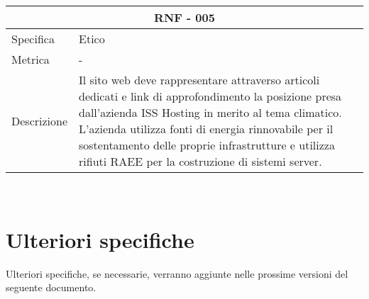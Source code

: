 \documentclass{article}
\begin{document}
\vspace{4mm} 
\begin{tabular}{ |p{3cm}|p{8cm}|  }
	\hline
	\multicolumn{2}{|c|}{\textbf{RNF - 005}} \\
	\hline
	Specifica&Etico \\
	\hline
	Metrica &  -\\
\hline
	Descrizione&Il sito web deve rappresentare attraverso articoli dedicati e link di approfondimento la posizione presa dall'azienda ISS Hosting in merito al tema climatico. L'azienda utilizza fonti di energia rinnovabile per il sostentamento delle proprie infrastrutture e utilizza rifiuti RAEE per la costruzione di sistemi server.\\
	\hline
\end{tabular}\\
\section{\textbf{Ulteriori specifiche}}
Ulteriori specifiche, se necessarie, verranno aggiunte nelle prossime versioni del seguente documento.
\end{document}
